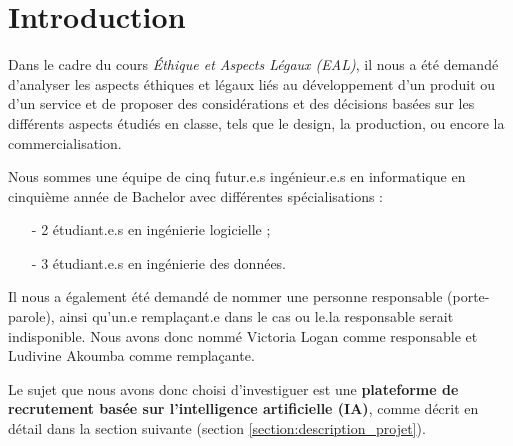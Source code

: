 \section{Introduction} 

Dans le cadre du cours \textit{Éthique et Aspects Légaux (EAL)}, il nous a été demandé d'analyser les aspects éthiques et légaux liés au développement d'un produit ou d'un service et de proposer des considérations et des décisions basées sur les différents aspects étudiés en classe, tels que le design, la production, ou encore la commercialisation.\newline

Nous sommes une équipe de cinq futur.e.s ingénieur.e.s en informatique en cinquième année de Bachelor avec différentes spécialisations :

\begin{enumerate}
    \item[-] 2 étudiant.e.s en ingénierie logicielle ; 
    \item[-] 3 étudiant.e.s en ingénierie des données.
\end{enumerate}


Il nous a également été demandé de nommer une personne responsable (porte-parole), ainsi qu'un.e remplaçant.e dans le cas ou le.la responsable serait indisponible. Nous avons donc nommé Victoria Logan comme responsable et Ludivine Akoumba comme remplaçante.\newline

Le sujet que nous avons donc choisi d'investiguer est une \textbf{plateforme de recrutement basée sur l'intelligence artificielle (IA)}, comme décrit en détail dans la section suivante (section \ref{section:description_projet}).